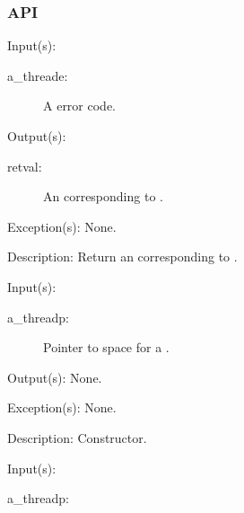 \subsubsection{API}
\begin{capi}
\label{nxo_threade_nxn}
	\begin{capilist}
	\item[Input(s): ]
		\begin{description}\item[]
		\item[a\_threade: ]
			A  error code.
		\end{description}
	\item[Output(s): ]
		\begin{description}\item[]
		\item[retval: ]
			An  corresponding to .
		\end{description}
	\item[Exception(s): ] None.
	\item[Description: ]
		Return an  corresponding to .
	\end{capilist}
\label{nxo_threadp_new}
	\begin{capilist}
	\item[Input(s): ]
		\begin{description}\item[]
		\item[a\_threadp: ]
			Pointer to space for a \classname{threadp}.
		\end{description}
	\item[Output(s): ] None.
	\item[Exception(s): ] None.
	\item[Description: ]
		Constructor.
	\end{capilist}
\label{nxo_threadp_delete}
	\begin{capilist}
	\item[Input(s): ]
		\begin{description}\item[]
		\item[a\_threadp: ]

\end{description}
\end{capilist}
\end{capi}
